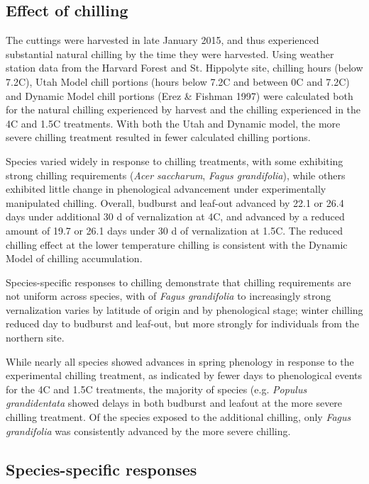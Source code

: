 \documentclass{article}
\begin{document}
\subsection*{Effect of chilling}
The cuttings were harvested in late January 2015, and thus experienced substantial natural chilling by the time they were harvested. Using weather station data from the Harvard Forest and St. Hippolyte site, chilling hours (below 7.2\degree C), Utah Model chill portions (hours below 7.2\degree C and between 0\degree C and 7.2\degree C) and Dynamic Model chill portions (Erez \& Fishman 1997) were calculated both for the natural chilling experienced by harvest and the chilling experienced in the 4\degree C and 1.5\degree C treatments. With both the Utah and Dynamic model, the more severe chilling treatment resulted in fewer calculated chilling portions.

Species varied widely in response to chilling treatments, with some exhibiting strong chilling requirements (\emph{Acer saccharum}, \emph{Fagus grandifolia}), while others exhibited little change in phenological advancement under experimentally manipulated chilling. Overall, budburst and leaf-out advanced by 22.1 or 26.4 days under additional 30 d of vernalization at 4\degree C, and advanced by a reduced amount of 19.7 or 26.1 days under 30 d of vernalization at 1.5\degree C. The reduced chilling effect at the lower temperature chilling is consistent with the Dynamic Model of chilling accumulation.

Species-specific responses to chilling demonstrate that chilling requirements are not uniform across species, with 
of \emph{Fagus grandifolia} to increasingly strong vernalization varies by latitude of origin and by phenological stage; winter chilling reduced day to budburst and leaf-out, but more strongly for individuals from the northern site.

While nearly all species showed advances in spring phenology in response to the experimental chilling treatment, as indicated by fewer days to phenological events for the 4\degree C and 1.5\degree C treatments, the majority of species (e.g. \emph{Populus grandidentata} showed delays in both budburst and leafout at the more severe chilling treatment. Of the species exposed to the additional chilling, only \emph{Fagus grandifolia} was consistently advanced by the more severe chilling.

\subsection*{Species-specific responses}
\end{document}
